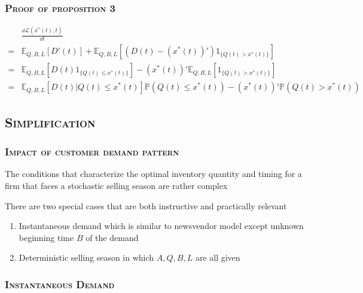 \documentclass[aspectratio=169]{../presentation}
\begin{document}
    \begin{frame}
        \frametitle{\textsc{Proof of proposition 3}}

        \begin{equation}
            \begin{aligned}
                &\frac{\dd \mathcal L(x^*(t), t)}{\dd t} \\
                =& \mathbb E_{Q, B, L}\left[D'(t)\right] + \mathbb{E}_{Q, B, L}\left[(D(t) - (x^*(t))')1_{\{Q(t) > x^*(t)\}}\right] \\
                =& \mathbb E_{Q, B, L}\left[D(t)1_{\{Q(t)\leq x^*(t)\}}\right] - (x^*(t))'\mathbb E_{Q, B, L}\left[1_{\{Q(t)>x^*(t)\}}\right] \\
                =& \mathbb E_{Q, B, L}\left[D(t) | Q(t)\leq x^*(t)\right]\mathbb P(Q(t)\leq x^*(t)) - (x^*(t))'\mathbb P(Q(t) > x^*(t))
            \end{aligned}
        \end{equation}

    \end{frame}

    \subsection{\textsc{Simplification}}

    \begin{frame}
        \frametitle{\textsc{Impact of customer demand pattern}}

        The conditions that characterize the optimal inventory quantity and timing for a firm that faces a stochastic selling season are rather complex

        There are two special cases that are both instructive and practically relevant

        \begin{enumerate}
            \item Instantaneous demand which is similar to newsvendor model except unknown beginning time $B$ of the demand
            \item Deterministic selling season in which $A, Q, B, L$ are all given
        \end{enumerate}

    \end{frame}

    \subsubsection{\textsc{Instantaneous Demand}}
\end{document}
